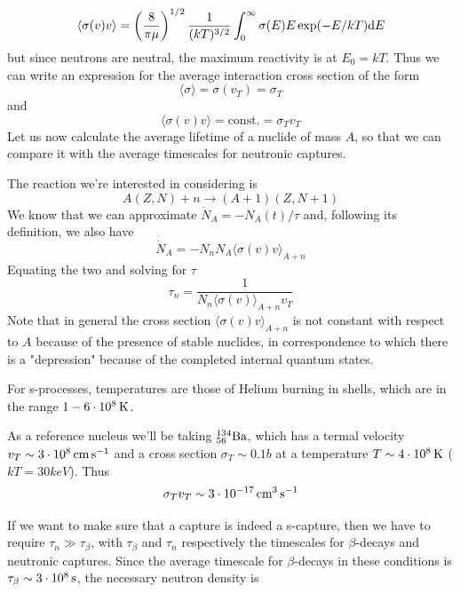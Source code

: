 \begin{equation*}
    \langle \sigma(v)v \rangle = \left(\frac{8}{\pi\mu}\right)^{1/2}\frac{1}{(kT)^{3/2}}\int_{0}^{\infty}\sigma(E)E\exp(-E/kT)\diff{E}
\end{equation*}
but since neutrons are neutral, the maximum reactivity is at $E_{0}=kT$. Thus we can write an expression for the average interaction cross section of the form 
\begin{equation*}
    \langle\sigma\rangle = \sigma(v_{T}) = \sigma_{T}
\end{equation*}
and 
\begin{equation*}
    \langle \sigma(v)v \rangle = \text{const.} = \sigma_{T}v_{T}
\end{equation*}
Let us now calculate the average lifetime of a nuclide of mass $A$, so that we can compare it with the average timescales for neutronic captures.
\par The reaction we're interested in considering is 
\begin{equation*}
    A(Z,N) + n \to (A+1)(Z,N+1)
\end{equation*}
We know that we can approximate $\dot{N}_{A} = -N_{A}(t)/\tau$ and, following its definition, we also have 
\begin{equation*}
    \dot{N}_{A} = -N_{n}N_{A} \langle \sigma(v)v \rangle_{A+n}
\end{equation*}
Equating the two and solving for $\tau$
\begin{equation}
    \tau_{n} = \frac{1}{N_{n}\langle \sigma(v) \rangle_{A+n}v_{T}}
    \label{eq:neutronictimescale}
\end{equation}
Note that in general the cross section $\langle \sigma(v)v \rangle_{A+n}$ is not constant with respect to $A$ because of the presence of stable nuclides, in correspondence to which there is a "depression" because of the completed internal quantum states.
\par For s-processes, temperatures are those of Helium burning in shells, which are in the range $1-6\power{10}{8}\unit{K}$.
\par As a reference nucleus we'll be taking $\element{Ba}{134}{56}$, which has a termal velocity $v_{T}\sim 3\power{10}{8}\unit{cm}\unit{s}^{-1}$ and a cross section $\sigma_{T}\sim 0.1\unit{b}$ at a temperature $T\sim 4\power{10}{8}\unit{K}$ ($kT=30\unit{keV}$). Thus
\begin{equation*}
    \sigma_{T}v_{T}\sim 3\power{10}{-17}\unit{cm}^{3}\unit{s}^{-1}
\end{equation*}
\par If we want to make sure that a capture is indeed a s-capture, then we have to require $\tau_{n}\gg \tau_{\beta}$, with $\tau_{\beta}$ and $\tau_{n}$ respectively the timescales for $\beta$-decays and neutronic captures. Since the average timescale for $\beta$-decays in these conditions is $\tau_{\beta}\sim 3\power{10}{8}\unit{s}$, the necessary neutron density is
